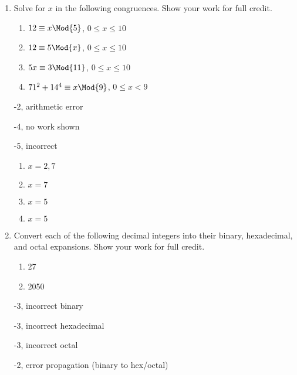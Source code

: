 \begin{enumerate}
\item Solve for $x$ in the following congruences. Show your work for full credit. 
\begin{enumerate}
    \item $12 \equiv x \Mod{5}$, $0 \leq x \leq 10$
    \item $12 \equiv 5 \Mod{x}$, $0 \leq x \leq 10$
    \item $5x \equiv 3\Mod{11}$, $0 \leq x \leq 10$
    \item $71^2 + 14^4 \equiv x\Mod{9}$, $0 \leq x < 9$
\end{enumerate}

\begin{rubric}
-2, arithmetic error

-4, no work shown

-5, incorrect
\end{rubric}

\vspace{2mm}
\begin{solution}
\begin{enumerate}
    \item $x=2,7$
    \item $x=7$
    \item $x=5$
    \item $x=5$
\end{enumerate}
\end{solution}

\item Convert each of the following decimal integers into their binary, hexadecimal, and octal expansions. Show your work for full credit. 
\begin{enumerate}
    \item 27
    \item 2050
\end{enumerate}

\begin{rubric}
-3, incorrect binary

-3, incorrect hexadecimal

-3, incorrect octal

-2, error propagation (binary to hex/octal)
\end{rubric}


\end{enumerate}

